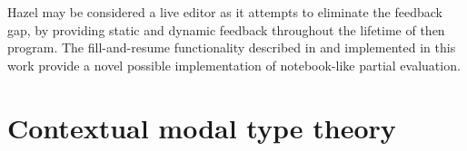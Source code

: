 Hazel may be considered a live editor as it attempts to eliminate the feedback gap, by providing static and dynamic feedback throughout the lifetime of then program. The fill-and-resume functionality described in \cite{conf/popl/HazelnutLive19} and implemented in this work provide a novel possible implementation of notebook-like partial evaluation.

\section{Contextual modal type theory}
\label{sec:cmtt}


